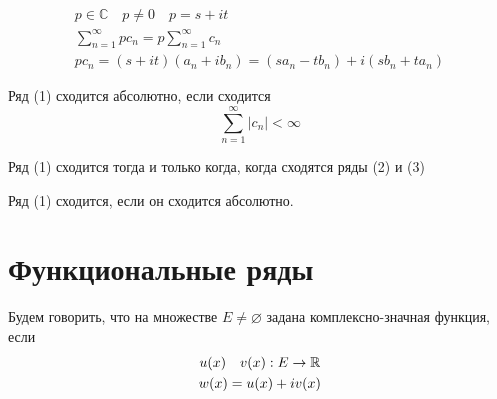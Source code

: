 \documentclass[main]{subfiles}
\begin{document}
\begin{gather*}
    p \in \mathbb{C} \quad p \ne 0 \quad p = s + it \\
    \sum^\infty_{n=1} pc_n = p \sum_{n=1}^\infty c_n \tag{5}\\
    pc_n = (s+it)(a_n + ib_n) = (sa_n-tb_n) + i(sb_n+ ta_n) 
\end{gather*}
\begin{definition}
    Ряд (1) сходится абсолютно, если сходится 
    \[\sum_{n=1}^\infty |c_n| < \infty \tag{6} \]
\end{definition}
\begin{theorem}
    Ряд (1) сходится тогда и только когда, когда сходятся ряды (2) и (3)
\end{theorem}
\begin{corollary}
    Ряд (1) сходится, если он сходится абсолютно.
\end{corollary}

\section*{Функциональные ряды}
\begin{definition}
    Будем говорить, что на множестве $E \ne \varnothing$ задана комплексно-значная функция, если
    \begin{gather*}
        u(x) \quad v(x) :  E \rightarrow \mathbb{R} \\
        w(x) = u(x) + i v(x)
    \end{gather*}
\end{definition}
\end{document}
